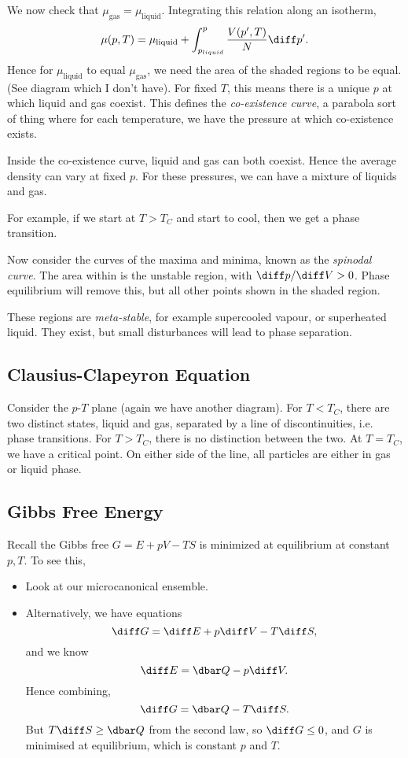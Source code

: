 \documentclass[12pt]{article}
\begin{document}
We now check that $\mu_{\mathrm{gas}} = \mu_{\mathrm{liquid}}$. Integrating this relation along an isotherm,
\[
\mu(p, T) = \mu_{\mathrm{liquid}} + \int_{p_{liquid}}^p \frac{V(p', T)}{N} \diff p'.
\]
Hence for $\mu_{\mathrm{liquid}}$ to equal $\mu_{\mathrm{gas}}$, we need the area of the shaded regions to be equal. (See diagram which I don't have). For fixed $T$, this means there is a unique $p$ at which liquid and gas coexist. This defines the \emph{co-existence curve}, a parabola sort of thing where for each temperature, we have the pressure at which co-existence exists.

Inside the co-existence curve, liquid and gas can both coexist. Hence the average density can vary at fixed $p$. For these pressures, we can have a mixture of liquids and gas.

For example, if we start at $T > T_C$ and start to cool, then we get a phase transition.

Now consider the curves of the maxima and minima, known as the \emph{spinodal curve}. The area within is the unstable region, with $\diff p / \diff V > 0$. Phase equilibrium will remove this, but all other points shown in the shaded region.

These regions are \emph{meta-stable}, for example supercooled vapour, or superheated liquid. They exist, but small disturbances will lead to phase separation.

\subsection{Clausius-Clapeyron Equation}
\label{sub:cceq}

Consider the $p$-$T$ plane (again we have another diagram). For $T < T_C$, there are two distinct states, liquid and gas, separated by a line of discontinuities, i.e. phase transitions. For $T > T_C$, there is no distinction between the two. At $T = T_C$, we have a critical point. On either side of the line, all particles are either in gas or liquid phase.

\subsection{Gibbs Free Energy}
\label{sub:gfe}

Recall the Gibbs free $G = E + p V - T S$ is minimized at equilibrium at constant $p, T$. To see this,
\begin{itemize}
	\item Look at our microcanonical ensemble.
	\item Alternatively, we have equations
		\[
		\diff G = \diff E + p \diff V - T \diff S,
		\]
		and we know
		\[
		\diff E = \dbar Q - p \diff V.
		\]
		Hence combining,
		\[
		\diff G = \dbar Q - T \diff S.
		\]
		But $T \diff S \geq \dbar Q$ from the second law, so $\diff G \leq 0$, and $G$ is minimised at equilibrium, which is constant $p$ and $T$.
\end{itemize}
\end{document}
